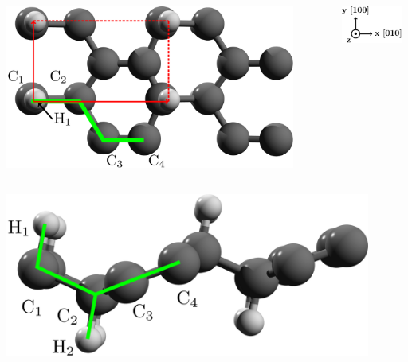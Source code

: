 \documentclass{beamer}
\begin{document}
\begin{frame}

\vspace{-3mm}
\begin{columns}

\flushright
\includegraphics[width=0.9\textwidth]{figs/alt1.pdf}

\vspace{5mm}

\flushleft
\includegraphics[width=0.9\textwidth]{figs/arrows1.pdf}

\end{columns}

\vspace{-5mm}

\begin{columns}

\flushright
\includegraphics[width=0.9\textwidth]{figs/alt2.pdf}


\end{columns}
\end{frame}
\end{document}
